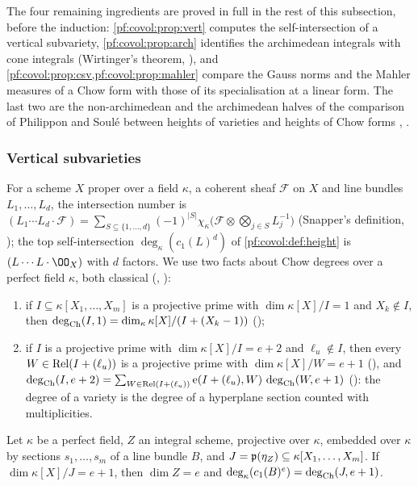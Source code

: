The four remaining ingredients are proved in full in the rest of this subsection, before the induction:
\cref{pf:covol:prop:vert} computes the self-intersection of a vertical subvariety,
\cref{pf:covol:prop:arch} identifies the archimedean integrals with cone integrals (Wirtinger's theorem,
\cite{GriffithsHarris1978}),
and \cref{pf:covol:prop:csv,pf:covol:prop:mahler} compare the Gauss norms and the Mahler measures of a Chow
form with those of its specialisation at a linear form. The last two are the non-archimedean and the
archimedean halves of the comparison of Philippon and Soul\'e between heights of varieties and heights of
Chow forms \cite{Philippon1991,Soule1991}, \cite[\S4.3]{BostGilletSoule1994}.

\subsubsection*{Vertical subvarieties}
For a scheme $X$ proper over a field $\kappa$, a coherent sheaf $\mathcal F$ on $X$ and line bundles
$L_1,\dots,L_d$, the intersection number is
$(L_1\cdots L_d\cdot\mathcal F)=\sum_{S\subseteq\{1,\dots,d\}}(-1)^{|S|}\chi_\kappa\bigl(\mathcal F\otimes
\bigotimes_{j\in S}L_j^{-1}\bigr)$ (Snapper's definition, \cite[Ch.~18]{Fulton1998}); the top
self-intersection $\deg_\kappa(c_1(L)^d)$ of \cref{pf:covol:def:height} is $(L\cdots L\cdot\OO_X)$ with $d$
factors. We use two facts about Chow degrees over a perfect field $\kappa$, both classical
(\cite{ChowVanDerWaerden1937}, \cite[\S1]{Philippon1986}):
\begin{enumerate}[label=(\roman*)]
\item if $I\subseteq\kappa[X_1,\dots,X_m]$ is a projective prime with $\dim\kappa[X]/I=1$ and
  $X_k\notin I$, then $\operatorname{deg}_{\mathrm{Ch}}(I,1)=\dim_\kappa\kappa[X]/(I+(X_k-1))$
  ();
\item if $I$ is a projective prime with $\dim\kappa[X]/I=e+2$ and $\ell_u\notin I$, then every
  $W\in\operatorname{Rel}(I+(\ell_u))$ is a projective prime with $\dim\kappa[X]/W=e+1$
  (), and
  $\operatorname{deg}_{\mathrm{Ch}}(I,e+2)=\sum_{W\in\operatorname{Rel}(I+(\ell_u))}\operatorname{e}(I+(\ell_u),W)\,\operatorname{deg}_{\mathrm{Ch}}(W,e+1)$
  (): the degree of a variety is the degree
  of a hyperplane section counted with multiplicities.
\end{enumerate}

\begin{lemma}\label{pf:covol:lem:fieldcase}
Let $\kappa$ be a perfect field, $Z$ an integral scheme, projective over $\kappa$, embedded over $\kappa$ by
sections $s_1,\dots,s_m$ of a line bundle $B$, and $J=\mathfrak{p}(\eta_Z)\subseteq\kappa[X_1,\dots,X_m]$. If
$\dim\kappa[X]/J=e+1$, then $\dim Z=e$ and $\deg_\kappa(c_1(B)^e)=\operatorname{deg}_{\mathrm{Ch}}(J,e+1)$.
\end{lemma}

